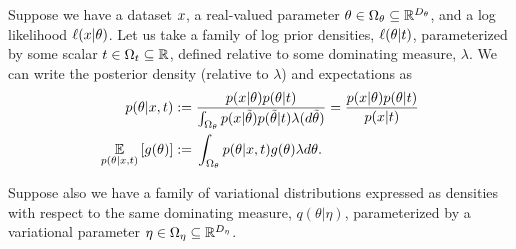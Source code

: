 Suppose we have a dataset $x$, a real-valued parameter $\theta \in \Omega_{\theta}
\subseteq \mathbb{R}^{D_{\theta}}$, and a log likelihood $\ell(x | \theta)$.
Let us take a family of log prior densities, $\ell(\theta \vert t)$,
parameterized by some scalar $t \in \Omega_{t} \subseteq \mathbb{R}$, defined
relative to some dominating measure, $\lambda$.  We can write the posterior
density (relative to $\lambda$) and expectations as
%
\begin{align*}
%
p(\theta \vert \x, \t) :={}&
    \frac{p(\x \vert \theta) p(\theta \vert \t)}
         {\int_{\thetadom} p(\x \vert \tilde{\theta}) p(\tilde{\theta} \vert \t)
               \lambda(d \tilde{\theta})}
= \frac{p(\x \vert \theta) p(\theta \vert \t)}{p(\x \vert \t)} \\
\expect{p(\theta \vert \x, \t)}{g(\theta)} :={}&
    \int_{\thetadom} p(\theta \vert \x, \t) g(\theta) \lambda{d\theta}.
%
\end{align*}
%

Suppose also we have a family of variational distributions
expressed as densities with respect to the same dominating measure, $q(\theta
\vert \eta)$, parameterized by a variational parameter $\eta \in \Omega_{\eta}
\subseteq \mathbb{R}^{D_{\eta}}$.

